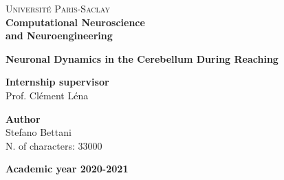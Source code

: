 \begin{titlepage}
	
	\noindent
	\begin{minipage}[t]{0.20\textwidth}
	\end{minipage}
	\begin{minipage}[t]{0.20\textwidth}
	\end{minipage}
	\hfill	
	\begin{minipage}[t]{0.50\textwidth}
		\begin{flushright}
	{
			{\textsc{Université Paris-Saclay}}\\
			\textbf{Computational Neuroscience\\ and Neuroengineering}\\
			\par

	}
\end{flushright}
	\end{minipage}
	
\vspace{40mm}
	
\begin{center}
		{\LARGE{
				\setstretch{1.2}
				\textbf{Neuronal Dynamics in the Cerebellum During Reaching}
				\par
		}}
	\end{center}
	
	\vspace{30mm}

	\noindent
	{\large \textbf{Internship supervisor}} \\
	\large{Prof. Clément Léna} \\

	\vspace{15mm}

	\begin{flushright}
		{\large \textbf{Author}} \\
		\large{Stefano Bettani} \\
		\large{N. of characters: 33000}
	\end{flushright}
	
	\vspace{30mm}
	\begin{center}
		{\large{\bf Academic year 2020-2021}}
	\end{center}

	\restoregeometry
	
\end{titlepage}
